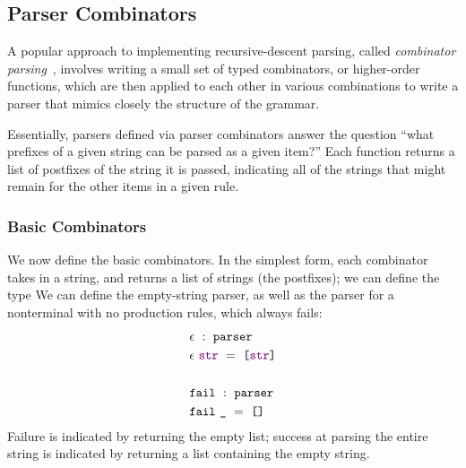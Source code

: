     \subsection{Parser Combinators}
      A popular approach to implementing recursive-descent parsing, called \emph{combinator parsing}~\cite{pcomb}, involves writing a small set of typed combinators, or higher-order functions, which are then applied to each other in various combinations to write a parser that mimics closely the structure of the grammar.
      
      Essentially, parsers defined via parser combinators answer the question ``what prefixes of a given string can be parsed as a given item?''  Each function returns a list of postfixes of the string it is passed, indicating all of the strings that might remain for the other items in a given rule.
      
    \subsubsection{Basic Combinators}
      We now define the basic combinators.  In the simplest form, each combinator takes in a string, and returns a list of strings (the postfixes); we can define the type
     We can define the empty-string parser, as well as the parser for a nonterminal with no production rules, which always fails:
\begin{align*}
&\epsilon~:~\texttt{parser}\\
&\epsilon~\textcolor{violet}{\texttt{str}}~=~\texttt{[}\textcolor{violet}{\texttt{str}}\texttt{]} \\ \\
&\texttt{fail}~:~\texttt{parser}\\
&\texttt{fail}~\texttt{\_}~=~\texttt{[]}
\end{align*}
      Failure is indicated by returning the empty list; success at parsing the entire string is indicated by returning a list containing the empty string.
      
